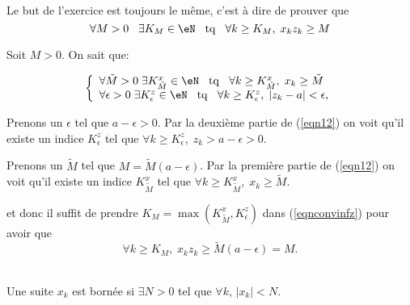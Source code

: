 \vspace{0.5cm}
\\

Le but de l'exercice est toujours le même, c'est à dire de prouver que
\begin{equation}		\label{eqnconvinfz}
  \forall M > 0 \hspace{0.3cm} \exists K_M \in \eN \hspace{0.3cm} {\rm tq} \hspace{0.3cm} \forall k \geq K_M, \;x_k  z_k \geq M
\end{equation}

\noindent Soit $M>0$. On sait  que:

\begin{equation}
\label{eqn12}\left\{\begin{array}{l}
        \forall \tilde{M} >0 \;\exists K^x_{\tilde{M}} \in \eN \hspace{0.3cm} {\rm tq} \hspace{0.3cm} \forall k \geq K^x_{\tilde{M}},\; x_k \geq  \tilde{M} \\
       \forall \epsilon >0\;\exists K^z_\epsilon \in \eN \hspace{0.3cm} {\rm tq} \hspace{0.3cm} \forall k \geq K^z_\epsilon,\; |z_k-a| <\epsilon,
\end{array}\right.\end{equation}

\noindent Prenons un $\epsilon$ tel que $a-\epsilon>0$. Par la deuxième partie de (\ref{eqn12}) on voit qu'il existe un indice $ K^z_\epsilon$ tel que $ \forall k \geq K^z_\epsilon,\; z_k > a-\epsilon >0$.

\noindent Prenons un $\tilde{M}$ tel que $M= \tilde{M}(a-\epsilon)$. Par la première partie de (\ref{eqn12}) on voit qu'il existe un indice $ K^x_{\tilde{M}} $ tel que $\forall k \geq K^x_{\tilde{M}},\; x_k \geq  \tilde{M} $.


\noindent et donc il suffit  de prendre  $K_M = \max(K_{\tilde{M}}^x, K^z_\epsilon)$ dans (\ref{eqnconvinfz}) pour avoir que
\[ \forall k \geq K_M, \;x_k  z_k \geq \tilde{M}(a-\epsilon)=M.\]


\\

\noindent Une suite $x_k$ est bornée si $\exists N>0$ tel que $\forall k$, $|x_k| < N$.

